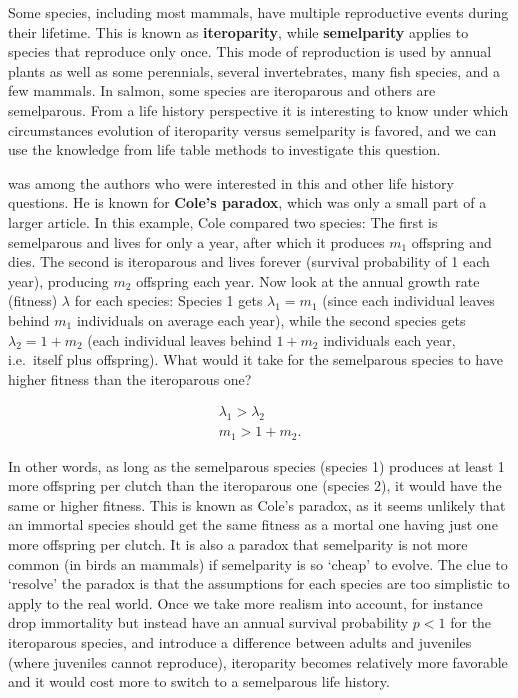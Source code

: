 \documentclass[
]{book}
\begin{document}
Some species, including most mammals, have multiple reproductive events during their lifetime. This is known as \textbf{iteroparity}, while \textbf{semelparity} applies to species that reproduce only once. This mode of reproduction is used by annual plants as well as some perennials, several invertebrates, many fish species, and a few mammals. In salmon, some species are iteroparous and others are semelparous. From a life history perspective it is interesting to know under which circumstances evolution of iteroparity versus semelparity is favored, and we can use the knowledge from life table methods to investigate this question.

\citet{Cole1} was among the authors who were interested in this and other life history questions. He is known for \textbf{Cole's paradox}, which was only a small part of a larger article. In this example, Cole compared two species: The first is semelparous and lives for only a year, after which it produces \(m_1\) offspring and dies. The second is iteroparous and lives forever (survival probability of 1 each year), producing \(m_2\) offspring each year. Now look at the annual growth rate (fitness) \(\lambda\) for each species: Species 1 gets \(\lambda_1=m_1\) (since each individual leaves behind \(m_1\) individuals on average each year), while the second species gets \(\lambda_2=1+m_2\) (each individual leaves behind \(1+m_2\) individuals each year, i.e.~itself plus offspring). What would it take for the semelparous species to have higher fitness than the iteroparous one?

\begin{align}
\lambda_1 > \lambda_2\\
m_ 1> 1+m_2.
\end{align}

In other words, as long as the semelparous species (species 1) produces at least 1 more offspring per clutch than the iteroparous one (species 2), it would have the same or higher fitness. This is known as Cole's paradox, as it seems unlikely that an immortal species should get the same fitness as a mortal one having just one more offspring per clutch. It is also a paradox that semelparity is not more common (in birds an mammals) if semelparity is so `cheap' to evolve. The clue to `resolve' the paradox is that the assumptions for each species are too simplistic to apply to the real world. Once we take more realism into account, for instance drop immortality but instead have an annual survival probability \(p<1\) for the iteroparous species, and introduce a difference between adults and juveniles (where juveniles cannot reproduce), iteroparity becomes relatively more favorable and it would cost more to switch to a semelparous life history.
\end{document}
